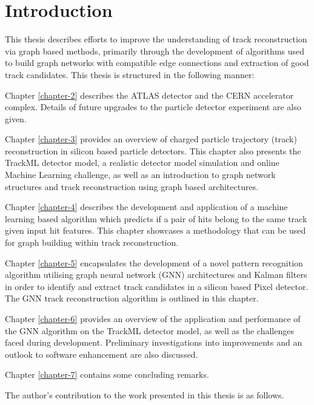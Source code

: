 
\chapter{Introduction}

\setlength\parindent{0pt}

This thesis describes efforts to improve the understanding of track reconstruction via graph based methods, primarily through the development of algorithms used to build graph networks with compatible edge connections and extraction of good track candidates. This thesis is structured in the following manner:

Chapter \ref{chapter-2} describes the ATLAS detector and the CERN accelerator complex. Details of future upgrades to the particle detector experiment are also given.

Chapter \ref{chapter-3} provides an overview of charged particle trajectory (track) reconstruction in silicon based particle detectors. This chapter also presents the TrackML detector model, a realistic detector model simulation and online Machine Learning challenge, as well as an introduction to graph network structures and track reconstruction using graph based architectures.

Chapter \ref{chapter-4} describes the development and application of a machine learning based algorithm which predicts if a pair of hits belong to the same track given input hit features. This chapter showcases a methodology that can be used for graph building within track reconstruction.

Chapter \ref{chapter-5} encapsulates the development of a novel pattern recognition algorithm utilising graph neural network (GNN) architectures and Kalman filters in order to identify and extract track candidates in a silicon based Pixel detector. The GNN track reconstruction algorithm is outlined in this chapter.

Chapter \ref{chapter-6} provides an overview of the application and performance of the GNN algorithm on the TrackML detector model, as well as the challenges faced during development. Preliminary investigations into improvements and an outlook to software enhancement are also discussed.

Chapter \ref{chapter-7} contains some concluding remarks.

The author’s contribution to the work presented in this thesis is as follows.

